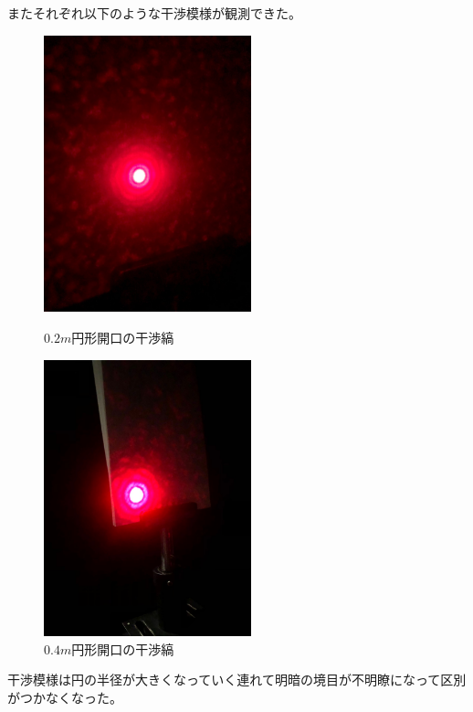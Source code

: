\documentclass[11pt, a4paper]{jsarticle}
\begin{document}
またそれぞれ以下のような干渉模様が観測できた。
\begin{figure}[htbp]
 \begin{minipage}{0.45\hsize}
  \begin{center}
   \includegraphics[width=60mm]{fig6.png}
  \end{center}
  \caption{$0.2m$円形開口の干渉縞}
  \label{fig:six}
 \end{minipage}
 \begin{minipage}{0.45\hsize}
  \begin{center}
   \includegraphics[width=60mm]{fig7.png}
  \end{center}
  \caption{$0.4m$円形開口の干渉縞}
  \label{fig:seven}
 \end{minipage}
\end{figure}


干渉模様は円の半径が大きくなっていく連れて明暗の境目が不明瞭になって区別がつかなくなった。
\end{document}
